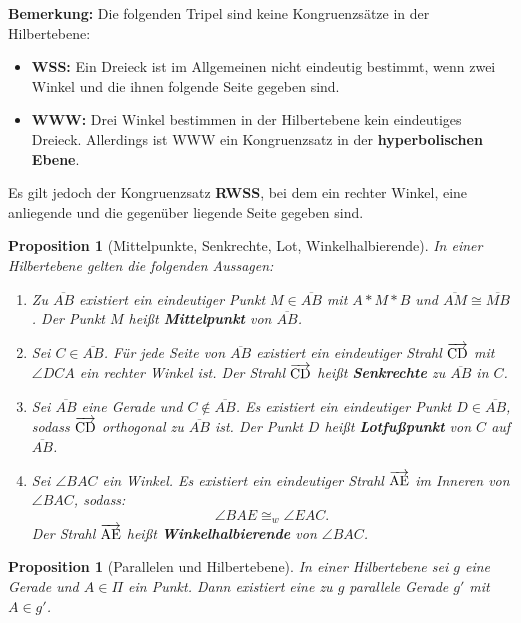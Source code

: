 \documentclass[a4paper,12pt]{article}
\theoremstyle{break}
\newtheorem{proposition}[definition]{Proposition}
\begin{document}
\textbf{Bemerkung:}
Die folgenden Tripel sind keine Kongruenzsätze in der Hilbertebene:
\begin{itemize}
    \item \textbf{WSS:} Ein Dreieck ist im Allgemeinen nicht eindeutig bestimmt, wenn zwei Winkel und die ihnen folgende Seite gegeben sind.
    \item \textbf{WWW:} Drei Winkel bestimmen in der Hilbertebene kein eindeutiges Dreieck. Allerdings ist WWW ein Kongruenzsatz in der \textbf{hyperbolischen Ebene}.
\end{itemize}

Es gilt jedoch der Kongruenzsatz \textbf{RWSS}, bei dem ein rechter Winkel, eine anliegende und die gegenüber liegende Seite gegeben sind.

\begin{proposition}[Mittelpunkte, Senkrechte, Lot, Winkelhalbierende]\label{prop:mittelpunkt}
In einer Hilbertebene gelten die folgenden Aussagen:
\begin{enumerate}
    \item Zu \(\overline{AB}\) existiert ein eindeutiger Punkt \(M \in \overline{AB}\) mit \(A * M * B\) und \(\overline{AM} \cong \overline{MB}\). Der Punkt \(M\) heißt \textbf{Mittelpunkt} von \(\overline{AB}\).
    \item Sei \(C \in \overline{AB}\). Für jede Seite von \(\overline{AB}\) existiert ein eindeutiger Strahl \(\overrightarrow{\rm CD}\) mit \(\angle DCA\) ein rechter Winkel ist. Der Strahl \(\overrightarrow{\rm CD}\) heißt \textbf{Senkrechte} zu \(\overline{AB}\) in \(C\).
    \item Sei \(\overline{AB}\) eine Gerade und \(C \notin \overline{AB}\). Es existiert ein eindeutiger Punkt \(D \in \overline{AB}\), sodass \(\overrightarrow{\rm CD}\) orthogonal zu \(\overline{AB}\) ist. Der Punkt \(D\) heißt \textbf{Lotfußpunkt} von \(C\) auf \(\overline{AB}\).
    \item Sei \(\angle BAC\) ein Winkel. Es existiert ein eindeutiger Strahl \(\overrightarrow{\rm AE}\) im Inneren von \(\angle BAC\), sodass:
    \[
    \angle BAE \cong_w \angle EAC.
    \]
    Der Strahl \(\overrightarrow{\rm AE}\) heißt \textbf{Winkelhalbierende} von \(\angle BAC\).
\end{enumerate}
\end{proposition}

\begin{proposition}[Parallelen und Hilbertebene]
In einer Hilbertebene sei \(g\) eine Gerade und \(A \in \Pi\) ein Punkt. Dann existiert eine zu \(g\) parallele Gerade \(g'\) mit \(A \in g'\).
\end{proposition}
\end{document}
